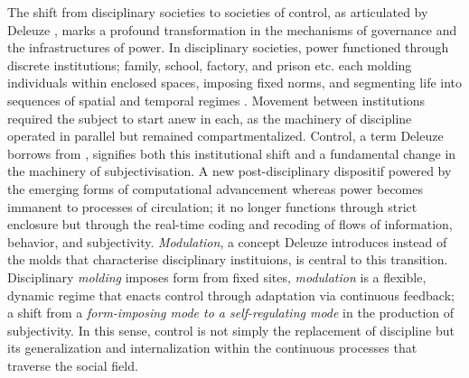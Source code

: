 
The shift from disciplinary societies to societies of control, as articulated by Deleuze \parencite{deleuze1995a}, marks a profound transformation in the mechanisms of governance and the infrastructures of power. In disciplinary societies, power functioned through discrete institutions; family, school, factory, and prison etc. each molding individuals within enclosed spaces, imposing fixed norms, and segmenting life into sequences of spatial and temporal regimes \parencite[4]{deleuze1992a}. Movement between institutions required the subject to start anew in each, as the machinery of discipline operated in parallel but remained compartmentalized. Control, a term Deleuze borrows from \citeauthor{burroughs1979} \parencite*[]{burroughs1979}, signifies both this institutional shift and a fundamental change in the machinery of subjectivisation. A new post-disciplinary dispositif powered by the emerging forms of computational advancement whereas power becomes immanent to processes of circulation; it no longer functions through strict enclosure but through the real-time coding and recoding of flows of information, behavior, and subjectivity. \textit{Modulation}, a concept Deleuze introduces instead of the molds that characterise disciplinary instituions, is central to this transition. Disciplinary \textit{molding} imposes form from fixed sites, \textit{modulation} is a flexible, dynamic regime that enacts control through adaptation via continuous feedback; a shift from a \textit{form-imposing mode to a self-regulating mode} \parencite[74]{hui2015} in the production of subjectivity. In this sense, control is not simply the replacement of discipline but its generalization and internalization within the continuous processes that traverse the social field.

